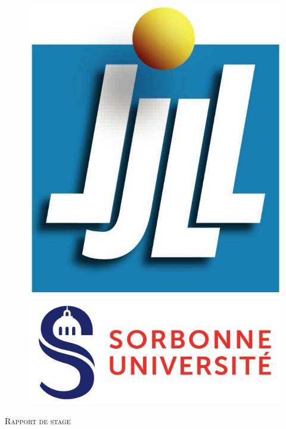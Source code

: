 \documentclass[ 
11pt, %
french, %
singlespacing, %
parskip, %
headsepline, %
openany, %
]{MastersDoctoralThesis} %
\numberwithin{theorem}{section}  %
\begin{document}
\begin{titlepage}
\begin{figure}[!htb]
\begin{minipage}{0.24\textwidth}
     \includegraphics[width=.6\linewidth]{LogoLJLL.jpg}
   \end{minipage}
   \begin{minipage}{0.24\textwidth}
    \centering
    \includegraphics[width=.99\linewidth]{LogoSorbonne.png}
  \end{minipage}
\end{figure}


\begin{center}

\vspace*{.04\textheight}
\textsc{\Large Rapport de stage}\\[0.5cm] %

\HRule \\[0.4cm] %
{\huge \bfseries \ttitle\par}\vspace{0.4cm} %
\HRule \\[1.5cm] %


\end{center}
\end{titlepage}
\end{document}
